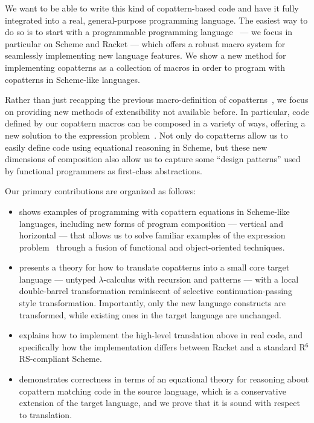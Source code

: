We want to be able to write this kind of copattern-based code and have it fully integrated into a real, general-purpose programming language.
The easiest way to do so is to start with a programmable programming language~\cite{ProgrammablePL} --- we focus in particular on Scheme and Racket --- which offers a robust macro system for seamlessly implementing new language features.
We show a new method for implementing copatterns as a collection of macros in order to program with copatterns in Scheme-like languages.

Rather than just recapping the previous macro-definition of copatterns~\cite{LaforgueR17}, we focus on providing new methods of extensibility not available before.
In particular, code defined by our copattern macros can be composed in a variety of ways,
offering a new solution to the expression problem~\cite{ExpressionProblem}.
Not only do copatterns allow us to easily define code using equational reasoning in Scheme, but these new dimensions of composition also allow us to capture some ``design patterns'' used by functional programmers as first-class abstractions.

Our primary contributions are organized as follows:
\begin{itemize}
\item {} shows examples of programming with copattern equations in Scheme-like languages, including new forms of program composition --- vertical and horizontal --- that allows us to solve familiar examples of the expression problem~\cite{ExpressionProblem} through a fusion of functional and object-oriented techniques.
\item {} presents a theory for how to translate copatterns into a small core target language --- untyped $\lambda$-calculus with recursion and patterns --- with a local double-barrel transformation reminiscent of selective continuation-passing style transformation.
  Importantly, only the new language constructs are transformed, while existing ones in the target language are unchanged.
\item {} explains how to implement the high-level translation above in real code, and specifically how the implementation differs between Racket and a standard R${}^6$RS-compliant Scheme.
\item {} demonstrates correctness in terms of an equational theory for reasoning about copattern matching code in the source language, which is a conservative extension of the target language, and we prove that it is sound with respect to translation.
\end{itemize} 


